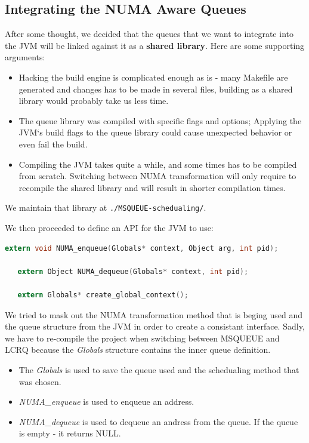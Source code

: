 \documentclass{article}
\begin{document}
 \newpage

 \subsection{Integrating the NUMA Aware Queues} \label{queues:integration}
 After some thought, we decided that the queues that we want to integrate into the JVM will be linked against it as a \textbf{shared library}. Here are some supporting arguments:
 \begin{itemize}
   \item Hacking the build engine is complicated enough as is - many Makefile are generated and changes has to be made in several files, building as a shared library would probably take us less time.
   \item The queue library was compiled with specific flags and options; Applying the JVM`s build flags to the queue library could cause unexpected behavior or even fail the build.
   \item Compiling the JVM takes quite a while, and some times has to be compiled from scratch. Switching between NUMA transformation will only require to recompile the shared library and will result in shorter compilation times.
 \end{itemize}

 We maintain that library at \texttt{./MSQUEUE-schedualing/}. 

 We then proceeded to define an API for the JVM to use:
 \begin{lstlisting}[language=C]
   extern void NUMA_enqueue(Globals* context, Object arg, int pid);

   extern Object NUMA_dequeue(Globals* context, int pid);
   
   extern Globals* create_global_context();
 \end{lstlisting}

 We tried to mask out the NUMA transformation method that is beging used and the queue structure from the JVM in order to create a consistant interface. Sadly, we have to re-compile the project when switching between MSQUEUE and LCRQ because the \textit{Globals} structure contains the inner queue definition.

 \begin{itemize}
   \item The \textit{Globals} is used to save the queue used and the schedualing method that was chosen.
   \item \textit{NUMA\_enqueue} is used to enqueue an address.
   \item \textit{NUMA\_dequeue} is used to dequeue an andress from the queue. If the queue is empty - it returns NULL.
 \end{itemize}
\end{document}
